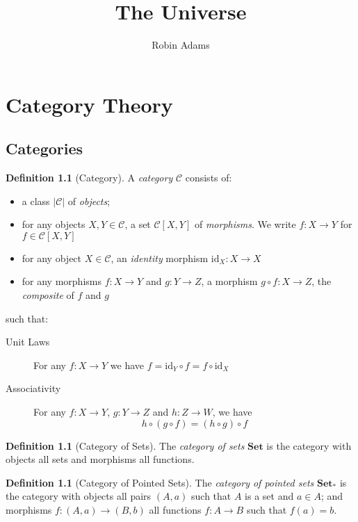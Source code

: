 \documentclass{book}
\title{The Universe}
\author{Robin Adams}
\theoremstyle{definition}
\newtheorem{definition}[lemma]{Definition}
\newcommand{\CC}{\ensuremath{\mathcal{C}}}
\newcommand{\id}[1]{\ensuremath{\mathrm{id}_{#1}}}
\begin{document}
\maketitle
\tableofcontents

\chapter{Category Theory}

\section{Categories}

\begin{definition}[Category]
    A \emph{category} $\CC$ consists of:
    \begin{itemize}
        \item a class $|\CC|$ of \emph{objects};
        \item for any objects $X, Y \in \CC$, a set $\CC[X,Y]$ of \emph{morphisms}. We write $f : X \rightarrow Y$
        for $f \in \CC[X,Y]$
        \item for any object $X \in \CC$, an \emph{identity} morphism $\id{X} : X \rightarrow X$
        \item for any morphisms $f : X \rightarrow Y$ and $g : Y \rightarrow Z$, a morphism $g \circ f : X \rightarrow Z$,
        the \emph{composite} of $f$ and $g$
    \end{itemize}
    such that:
    \begin{description}
        \item[Unit Laws] For any $f : X \rightarrow Y$ we have $f = \id{Y} \circ f = f \circ \id{X}$
        \item[Associativity] For any $f : X \rightarrow Y$, $g : Y \rightarrow Z$ and $h : Z \rightarrow W$, we have
        \[ h \circ (g \circ f) = (h \circ g) \circ f \]
    \end{description}
\end{definition}

\begin{definition}[Category of Sets]
    The \emph{category of sets} $\mathbf{Set}$ is the category with objects all sets and morphisms all functions.
\end{definition}

\begin{definition}[Category of Pointed Sets]
    The \emph{category of pointed sets} $\mathbf{Set}_*$ is the category with objects all pairs $(A,a)$ such that $A$ is a set and $a \in A$;
    and morphisms $f : (A,a) \rightarrow (B,b)$ all functions $f : A \rightarrow B$ such that $f(a) = b$.
\end{definition}
\end{document}
